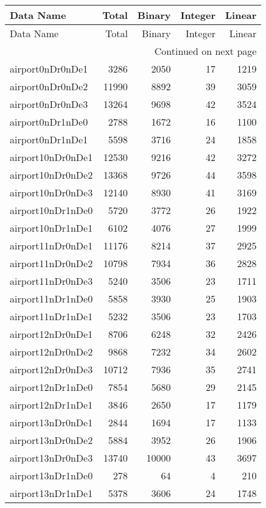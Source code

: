 
\begin{longtable}{lrrrr}
\toprule
Data Name & Total & Binary & Integer & Linear \\
\midrule
\endfirsthead
\toprule
Data Name & Total & Binary & Integer & Linear \\
\midrule
\endhead
\midrule
\multicolumn{5}{r}{Continued on next page} \\
\midrule
\endfoot
\bottomrule
\endlastfoot
airport0nDr0nDe1 & 3286 & 2050 & 17 & 1219 \\
airport0nDr0nDe2 & 11990 & 8892 & 39 & 3059 \\
airport0nDr0nDe3 & 13264 & 9698 & 42 & 3524 \\
airport0nDr1nDe0 & 2788 & 1672 & 16 & 1100 \\
airport0nDr1nDe1 & 5598 & 3716 & 24 & 1858 \\
airport10nDr0nDe1 & 12530 & 9216 & 42 & 3272 \\
airport10nDr0nDe2 & 13368 & 9726 & 44 & 3598 \\
airport10nDr0nDe3 & 12140 & 8930 & 41 & 3169 \\
airport10nDr1nDe0 & 5720 & 3772 & 26 & 1922 \\
airport10nDr1nDe1 & 6102 & 4076 & 27 & 1999 \\
airport11nDr0nDe1 & 11176 & 8214 & 37 & 2925 \\
airport11nDr0nDe2 & 10798 & 7934 & 36 & 2828 \\
airport11nDr0nDe3 & 5240 & 3506 & 23 & 1711 \\
airport11nDr1nDe0 & 5858 & 3930 & 25 & 1903 \\
airport11nDr1nDe1 & 5232 & 3506 & 23 & 1703 \\
airport12nDr0nDe1 & 8706 & 6248 & 32 & 2426 \\
airport12nDr0nDe2 & 9868 & 7232 & 34 & 2602 \\
airport12nDr0nDe3 & 10712 & 7936 & 35 & 2741 \\
airport12nDr1nDe0 & 7854 & 5680 & 29 & 2145 \\
airport12nDr1nDe1 & 3846 & 2650 & 17 & 1179 \\
airport13nDr0nDe1 & 2844 & 1694 & 17 & 1133 \\
airport13nDr0nDe2 & 5884 & 3952 & 26 & 1906 \\
airport13nDr0nDe3 & 13740 & 10000 & 43 & 3697 \\
airport13nDr1nDe0 & 278 & 64 & 4 & 210 \\
airport13nDr1nDe1 & 5378 & 3606 & 24 & 1748 \\

\end{longtable}
